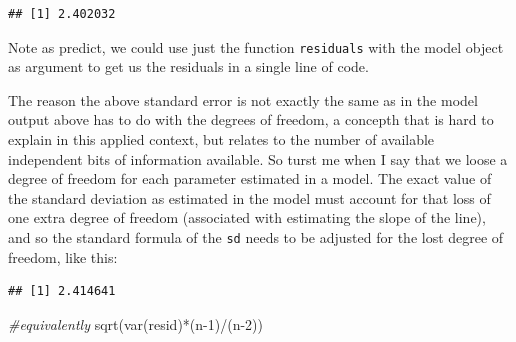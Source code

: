 \documentclass[
]{book}
\newenvironment{Shaded}{\begin{snugshade}}{\end{snugshade}}
\newcommand{\CommentTok}[1]{\textcolor[rgb]{0.56,0.35,0.01}{\textit{#1}}}
\newcommand{\DecValTok}[1]{\textcolor[rgb]{0.00,0.00,0.81}{#1}}
\newcommand{\FunctionTok}[1]{\textcolor[rgb]{0.00,0.00,0.00}{#1}}
\newcommand{\NormalTok}[1]{#1}
\newcommand{\OtherTok}[1]{\textcolor[rgb]{0.56,0.35,0.01}{#1}}
\newcommand{\SpecialCharTok}[1]{\textcolor[rgb]{0.00,0.00,0.00}{#1}}
\begin{document}
\begin{verbatim}
## [1] 2.402032
\end{verbatim}

Note as predict, we could use just the function \texttt{residuals} with the model object as argument to get us the residuals in a single line of code.

The reason the above standard error is not exactly the same as in the model output above has to do with the degrees of freedom, a concepth that is hard to explain in this applied context, but relates to the number of available independent bits of information available. So turst me when I say that we loose a degree of freedom for each parameter estimated in a model. The exact value of the standard deviation as estimated in the model must account for that loss of one extra degree of freedom (associated with estimating the slope of the line), and so the standard formula of the \texttt{sd} needs to be adjusted for the lost degree of freedom, like this:

\begin{Shaded}
\end{Shaded}

\begin{verbatim}
## [1] 2.414641
\end{verbatim}

\begin{Shaded}
\begin{Highlighting}[]
\CommentTok{\#equivalently}
\FunctionTok{sqrt}\NormalTok{(}\FunctionTok{var}\NormalTok{(resid)}\SpecialCharTok{*}\NormalTok{(n}\DecValTok{{-}1}\NormalTok{)}\SpecialCharTok{/}\NormalTok{(n}\DecValTok{{-}2}\NormalTok{))}
\end{Highlighting}
\end{Shaded}
\end{document}
